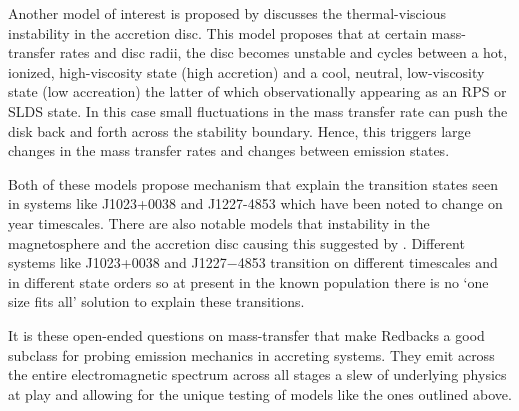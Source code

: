 Another model of interest is proposed by \cite{jia_evolution_2015} discusses the thermal-viscious instability in the accretion disc. This model proposes that at certain mass-transfer rates and disc radii, the disc becomes unstable and cycles between a hot, ionized, high-viscosity state (high accretion) and a cool, neutral, low-viscosity state (low accreation) the latter of which observationally appearing as an RPS or SLDS state. In this case small fluctuations in the mass transfer rate can push the disk back and forth across the stability boundary. Hence, this triggers large changes in the mass transfer rates and changes between emission states. 

Both of these models propose mechanism that explain the transition states seen in systems like J1023+0038 and J1227-4853 \citep{phosrisom_optical_2026} which have been noted to change on year timescales. There are also notable models that instability in the magnetosphere and the accretion disc causing this suggested by \cite{vurgun_energy_2025}. Different systems like J1023+0038 and J1227−4853 transition on different timescales and in different state orders so at present in the known population there is no `one size fits all' solution to explain these transitions. 

It is these open-ended questions on mass-transfer that make Redbacks a good subclass for probing emission mechanics in accreting systems.  They emit across the entire electromagnetic spectrum across all stages a slew of underlying physics at play and allowing for the unique testing of models like the ones outlined above. 

